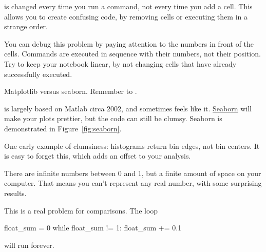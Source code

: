 \documentclass[justified, nobib]{tufte-handout}
\begin{document}
 is changed every time you run a command, not
every time you add a cell.
This allows you to create confusing code, by removing cells or executing them in a strange order.



\noindent
You can debug this problem by paying attention to the numbers in front of the cells.
Commands are executed in sequence with their numbers, not their position.
Try to keep your notebook linear, by not changing cells that have already successfully executed.

\pagebreak
\begin{marginfigure}
    \vspace*{\fill}
    \centering

    \def\svgwidth{140pt}

    \vspace*{\fill}
    \bigskip
    \def\svgwidth{140pt}
  \caption{Matplotlib versus seaborn.
  \hspace{\textwidth}Remember to .}
\label{fig:seaborn}
\end{marginfigure}

 is largely based on Matlab circa 2002, and sometimes feels like it. \href{https://stanford.edu/~mwaskom/software/seaborn/index.html}{Seaborn} will make your plots prettier, but the code can still be clumsy. Seaborn is demonstrated in Figure~\ref{fig:seaborn}.

\noindent
One early example of clumsiness: histograms return bin edges, not bin centers.
It is easy to forget this, which adds an offset to your analysis.



There are infinite numbers between 0 and 1, but a finite amount of space on your computer.
That means you can't represent any real number, with some surprising results.



\noindent
This is a real problem for comparisons.
The loop
\begin{pythoncode}
        float_sum = 0
        while float_sum != 1:
            float_sum += 0.1
\end{pythoncode}

\noindent
will run forever.
\end{document}
